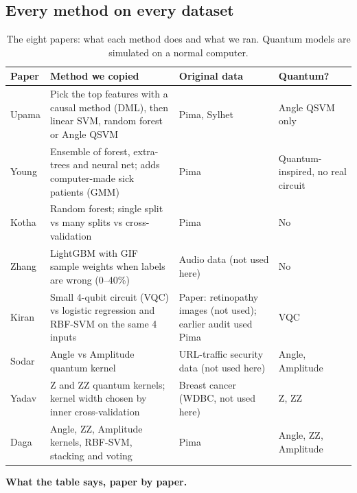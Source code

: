 \documentclass[11pt,a4paper]{article}
\begin{document}
\subsection{Every method on every dataset}
\begin{table}[H]\centering\scriptsize\caption{The eight papers: what each method does and what we ran. Quantum models are simulated on a normal computer.}
\begin{tabular}{p{1.3cm}p{5.2cm}p{5.0cm}p{3.6cm}}\toprule Paper & Method we copied & Original data & Quantum? \\\midrule
Upama & Pick the top features with a causal method (DML), then linear SVM, random forest or Angle QSVM & Pima, Sylhet & Angle QSVM only\\
Young & Ensemble of forest, extra-trees and neural net; adds computer-made sick patients (GMM) & Pima & Quantum-inspired, no real circuit\\
Kotha & Random forest; single split vs many splits vs cross-validation & Pima & No\\
Zhang & LightGBM with GIF sample weights when labels are wrong (0--40\%) & Audio data (not used here) & No\\
Kiran & Small 4-qubit circuit (VQC) vs logistic regression and RBF-SVM on the same 4 inputs & Paper: retinopathy images (not used); earlier audit used Pima & VQC\\
Sodar & Angle vs Amplitude quantum kernel & URL-traffic security data (not used here) & Angle, Amplitude\\
Yadav & Z and ZZ quantum kernels; kernel width chosen by inner cross-validation & Breast cancer (WDBC, not used here) & Z, ZZ\\
Daga & Angle, ZZ, Amplitude kernels, RBF-SVM, stacking and voting & Pima & Angle, ZZ, Amplitude\\\bottomrule\end{tabular}\end{table}
\begin{table}[H]\centering\scriptsize\caption{Clean test, mean over 5 folds $\times$ 3 seeds. Each cell is balanced accuracy / recall (0.50 / 0.00 = finds no sick people). Last row: accuracy you get by always guessing the biggest group.}
\end{table}
\textbf{What the table says, paper by paper.}
\end{document}

